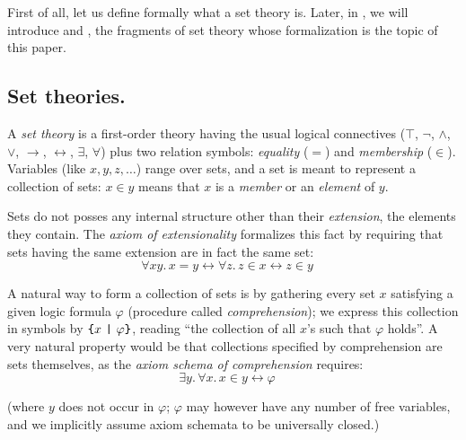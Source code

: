 \documentclass[sigplan,10pt,anonymous,review]{acmart}%
\begin{document}
\medskip

First of all, let us define formally what a set theory is. Later, in , we will introduce \NFTWO{} and \NFO{}, the fragments of \NF{} set theory whose formalization is the topic of this paper.

\subsection{Set theories.}\label{subs:st}
A \emph{set theory} is a first-order theory having the usual logical connectives ($\top$, $\neg$, $\land$, $\lor$, $\to$, $\leftrightarrow$, $\exists$, $\forall$) plus two relation symbols: \emph{equality} ($=$) and \emph{membership} ($\in$). Variables (like $x,y,z,\ldots$) range over sets, and a set is meant to represent a collection of sets: $x \in y$ means that $x$ is a \emph{member} or an \emph{element} of $y$.



Sets do not posses any internal structure other than their \emph{extension}, \ie{} the elements they contain. The \emph{axiom of extensionality} formalizes this fact by requiring that sets having the same extension are in fact the same set:
% 
\[\forall x y.\, x = y \leftrightarrow \forall z. \, z \in x \leftrightarrow z \in y \quad \tag{\SetExt} \]

A natural way to form a collection of sets is by gathering every set $x$ satisfying a given logic formula $\varphi$ (procedure called \emph{comprehension}); we express this collection in symbols by $\text{\texttt{\{}} x ~\text{\texttt{|}}~ \varphi \text{\texttt{\}}}$, reading ``the collection of all $x$'s such that $\varphi$ holds''. A very natural property would be that collections specified by comprehension are sets themselves, as the \emph{axiom schema of comprehension} requires:
% 
\[ \exists y.\, \forall x.\, x \in y \leftrightarrow \varphi  \quad \tag{\SetCompr} \]

(where $y$ does not occur in $\varphi$; $\varphi$ may however have any number of free variables, and we implicitly assume axiom schemata to be universally closed.)
\end{document}
